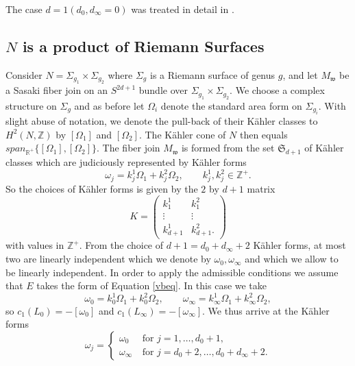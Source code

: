 \documentclass[12pt]{amsart}
\def\bbr{{\mathbb R}}
\def\bbz{{\mathbb Z}}
\def\gro{\omega}
\def\grO{\Omega}
\def\grS{\Sigma}
\def\gw{{\mathfrak w}}
\def\gS{{\mathfrak S}}
\begin{document}
The case $d=1 (d_0,d_\infty=0)$ was treated in detail in \cite{BoTo11,BoTo13}.


\subsection{$N$ is a product of Riemann Surfaces}\label{rsprod}
Consider $N=\grS_{g_1}\times \grS_{g_2}$ where $\grS_g$ is a Riemann surface of genus $g$, and let $M_\gw$ be a Sasaki fiber join on an $S^{2d+1}$ bundle over $\grS_{g_1}\times \grS_{g_2}$. 
We choose a complex structure on $\grS_g$ and as before let $\grO_i$ denote the standard area form on $\grS_{g_i}$.
With slight abuse of notation, we denote the pull-back of their K\"ahler classes to $H^2(N,\bbz)$ by $[\grO_1]$ and $[\grO_2]$.
The K\"ahler cone of $N$ then equals $span_{\bbr^+}\{[\grO_1],[\grO_2]\}$. The fiber join $M_\gw$ is formed from the set $\gS_{d+1}$ of K\"ahler classes which are judiciously represented by K\"ahler forms 
\begin{equation}\label{kmatrixeqn}
\gro_j=k^1_j\grO_1 +k^2_j\grO_2, \qquad k^1_j,k^2_j\in \bbz^+.
\end{equation}
So the choices of K\"ahler forms is given by the $2$ by $d+1$ matrix
\begin{equation}\label{Kmatrix}
K=
\begin{pmatrix} 
k^1_1 & k^2_1 \\
\vdots & \vdots \\
k^1_{d+1} & k^2_{d+1}.
\end{pmatrix}
\end{equation}
with values in $\bbz^+$. From the choice of $d+1=d_0+d_\infty +2$ K\"ahler forms, at most two are linearly independent which we denote by $\gro_0,\gro_\infty$ and which we allow to be linearly independent. In order to apply the admissible conditions we assume that $E$ takes the form of Equation \eqref{vbeq}. In this case we take  
\begin{equation}\label{kmatrixeqn2}
\gro_0=k^1_0\grO_1 +k^2_0\grO_2, \qquad \gro_\infty =k^1_\infty\grO_1 +k^2_\infty \grO_2,
\end{equation}
so $c_1(L_0)=-[\gro_0]$ and $c_1(L_\infty)=-[\gro_\infty]$.
We thus arrive at the K\"ahler forms
\begin{equation}\label{d0dinftyeqns}
\gro_{j}=\begin{cases} \gro_0 & ~\text{for $j=1,\ldots,d_0+1$}, \\
             \gro_\infty & ~\text{for $j=d_0+2,\ldots,d_0+d_\infty +2$}.
              \end{cases}
\end{equation}
\end{document}
